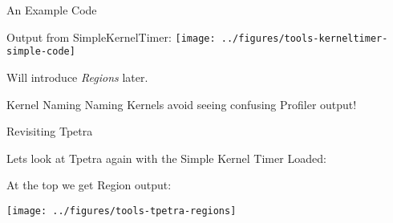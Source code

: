 
\begin{frame}[fragile]{An Example Code}

Output from SimpleKernelTimer:
\texttt{[image: ../figures/tools-kerneltimer-simple-code]}

\pause
\vspace{5pt}
Will introduce \textit{Regions} later.

\begin{block}{Kernel Naming}
Naming Kernels avoid seeing confusing Profiler output!
\end{block}

%
%
\end{frame}


\begin{frame}[fragile]{Revisiting Tpetra}

Lets look at Tpetra again with the Simple Kernel Timer Loaded:

\vspace{10pt}
At the top we get Region output:

\texttt{[image: ../figures/tools-tpetra-regions]}
\end{frame}

